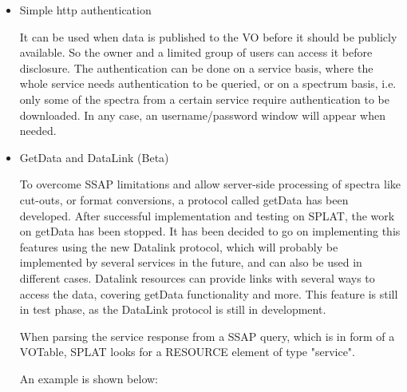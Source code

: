 \documentclass[final,authoryear,5p,times,twocolumn]{elsarticle}
\begin{document}
\begin{itemize}
\item{Simple http authentication}

  It can be used when data is published to the VO before it should be
  publicly available. So the owner and a limited group of users can
  access it before disclosure. The authentication can be done on a
  service basis, where the whole service needs authentication to be
  queried, or on a spectrum basis, i.e. only some of the spectra from
  a certain service require authentication to be downloaded. In any
  case, an username/password window will appear when needed.

\item{GetData and DataLink (Beta)}

  To overcome SSAP limitations and allow server-side processing of
  spectra like cut-outs, or format conversions, a protocol called
  getData has been developed. After successful implementation and
  testing on SPLAT, the work on getData has been stopped. It has been
  decided to go on implementing this features using the new Datalink
  protocol, which will probably be implemented by several services in
  the future, and can also be used in different cases.  Datalink
  resources can provide links with several ways to access the data,
  covering getData functionality and more. This feature is still in
  test phase, as the DataLink protocol is still in development.

  When parsing the service response from a SSAP query, which is in
  form of a VOTable, SPLAT looks for a RESOURCE element of type
  "service".

 An example is shown below:


\end{itemize}
\end{document}
